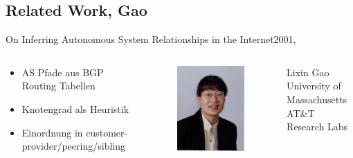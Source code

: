 \documentclass[ngerman,compress,hyperref={bookmarks}]{beamer}
\begin{document}
\subsection{Related Work, Gao}
\begin{frame}{On Inferring Autonomous System Relationships in the Internet}{2001, \cite{Gao:2001:IAS:504611.504616}}
  \begin{columns}[c]
    \begin{column}{0.5\textwidth}
      \begin{itemize}
        \item AS Pfade aus BGP Routing Tabellen
        \item Knotengrad als Heuristik
        \item Einordnung in customer-provider/peering/sibling
      \end{itemize}
    \end{column}
    \begin{column}{0.1\textwidth}
      \begin{figure}
        \includegraphics[width=1\textwidth]{images/gao}
        \label{gao}
      \end{figure}
    \end{column}
    \begin{column}{0.3\textwidth}
      {\scriptsize Lixin Gao\\
      \vspace{0.1cm}
      University of Massachusetts\\
      AT\&T Research Labs}
    \end{column}
  \end{columns}
\end{frame}
\end{document}
